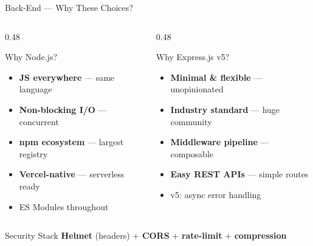 \documentclass[aspectratio=169, 12pt]{beamer}
\begin{document}
\begin{frame}[shrink=4]{Back-End --- Why These Choices?}\small

\begin{columns}[T]
\begin{column}{0.48\textwidth}
\begin{block}{Why Node.js?}
\begin{itemize}\itemsep=0pt
    \item \textbf{JS everywhere} --- same language
    \item \textbf{Non-blocking I/O} --- concurrent
    \item \textbf{npm ecosystem} --- largest registry
    \item \textbf{Vercel-native} --- serverless ready
    \item ES Modules throughout
\end{itemize}
\end{block}
\end{column}
\begin{column}{0.48\textwidth}
\begin{block}{Why Express.js v5?}
\begin{itemize}\itemsep=0pt
    \item \textbf{Minimal \& flexible} --- unopinionated
    \item \textbf{Industry standard} --- huge community
    \item \textbf{Middleware pipeline} --- composable
    \item \textbf{Easy REST APIs} --- simple routes
    \item v5: async error handling
\end{itemize}
\end{block}
\end{column}
\end{columns}

\vspace{4pt}
\begin{block}{Security Stack}
\textbf{Helmet} (headers) + \textbf{CORS} + \textbf{rate-limit} + \textbf{compression}
\end{block}
\end{frame}

\end{document}

